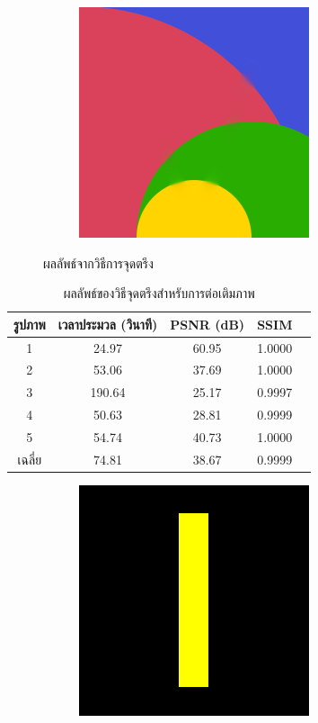 \documentclass[hidelinks, a4paper,12pt]{article}
\numberwithin{equation}{section}							%
\numberwithin{equation}{section}
\begin{document}
{\begin{figure}[H]
\begin{subfigure}{0.4\linewidth}
		\includegraphics[width=0.8\linewidth]{images/result_ex1/fixpoint05.png}			
	\end{subfigure}
	\caption{ผลลัพธ์จากวิธีการจุดตรึง}
\end{figure}
\begin{table}[H]
	\centering
	\begin{tabular}[ht]{|c|c|c|c|c|}
		\hline
		รูปภาพ &เวลาประมวล  (วินาที) & PSNR (dB) & SSIM \\
		\hline
		1 & 24.97 & 60.95 & 1.0000 \\ 
		2 & 53.06 & 37.69 & 1.0000 \\
		3 &  190.64 & 25.17 & 0.9997 \\
		4 & 50.63  & 28.81  & 0.9999 \\
		5 & 54.74  & 40.73  & 1.0000 \\
		\hline
		เฉลี่ย & 74.81  & 38.67  & 0.9999 \\
		\hline
	\end{tabular}
	\caption{ผลลัพธ์ของวิธีจุดตรึงสำหรับการต่อเติมภาพ}
\end{table}	
\begin{figure}[H]
	\centering
	\begin{subfigure}{0.4\linewidth}
		\centering
		\includegraphics[width=0.8\linewidth]{images/result_ex1/splitbergman01.png}

\end{subfigure}
\end{figure}}
\end{document}

